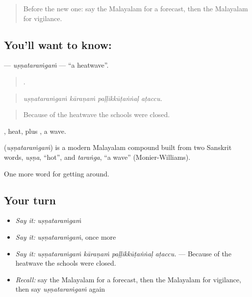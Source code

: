 \label{lesson:ML-C511-usnataramgam}



\begin{quote}
Before the new one: say the Malayalam for a forecast, then the Malayalam for vigilance.
\end{quote}

\subsection*{You'll want to know: }
\textbf{} — \emph{uṣṇataraṁgaṁ} — \textquotedblleft{}a heatwave\textquotedblright{}.

\begin{quote}
   .
\end{quote}

\begin{quote}
\emph{uṣṇataraṁgaṁ kāraṇaṁ paḷḷikkūṭaṅṅaḷ aṭaccu.}
\end{quote}

\begin{quote}
Because of the heatwave the schools were closed.
\end{quote}

, heat, plus , a wave.

\begin{cousinweb}
\textbf{} (\emph{uṣṇataraṁgaṁ}) is a modern Malayalam compound built from two Sanskrit words, \emph{uṣṇa}, \textquotedblleft{}hot\textquotedblright{}, and \emph{taraṅga}, \textquotedblleft{}a wave\textquotedblright{} (Monier-Williams).
\end{cousinweb}

\begin{grammarlens}[title={What you've built}]
One more word for getting around.
\end{grammarlens}

\subsection*{Your turn}
\begin{itemize}
\raggedright
  \item \emph{Say it:} \emph{uṣṇataraṁgaṁ}
  \item \emph{Say it:} \emph{uṣṇataraṁgaṁ}, once more
  \item \emph{Say it:} \emph{uṣṇataraṁgaṁ kāraṇaṁ paḷḷikkūṭaṅṅaḷ aṭaccu.} — Because of the heatwave the schools were closed.
  \item \emph{Recall:} say the Malayalam for a forecast, then the Malayalam for vigilance, then say \emph{uṣṇataraṁgaṁ} again
\end{itemize}

